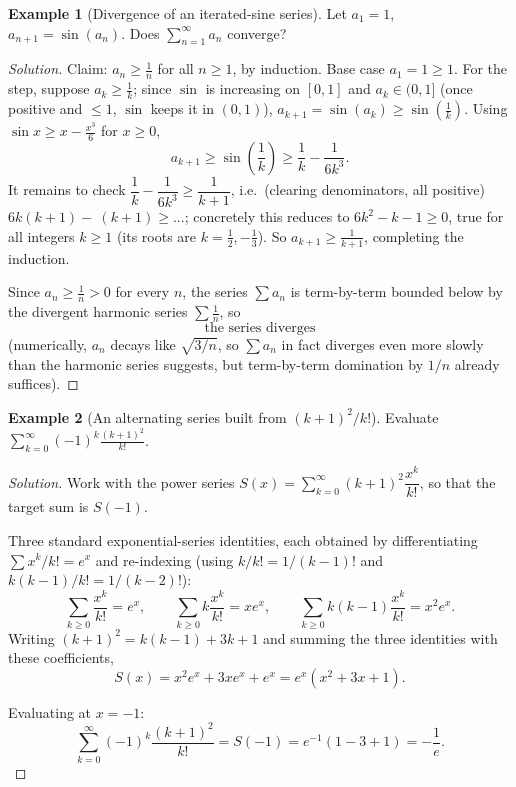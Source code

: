 \documentclass[11pt]{article}
\theoremstyle{definition}
\newtheorem{example}{Example}[section]
\begin{document}
\begin{example}[Divergence of an iterated-sine series]
Let $a_1=1$, $a_{n+1}=\sin(a_n)$. Does $\sum_{n=1}^\infty a_n$ converge?
\end{example}

\begin{proof}[Solution]
Claim: $a_n\ge\tfrac1n$ for all $n\ge1$, by induction. Base case $a_1=1\ge1$. For the step, suppose $a_k\ge\tfrac1k$; since $\sin$ is increasing on $[0,1]$ and $a_k\in(0,1]$ (once positive and $\le1$, $\sin$ keeps it in $(0,1)$), $a_{k+1}=\sin(a_k)\ge\sin\!\left(\tfrac1k\right)$. Using $\sin x\ge x-\tfrac{x^3}6$ for $x\ge0$,
\[
a_{k+1}\ge\sin\!\left(\frac1k\right)\ge\frac1k-\frac1{6k^3}.
\]
It remains to check $\dfrac1k-\dfrac1{6k^3}\ge\dfrac1{k+1}$, i.e.\ (clearing denominators, all positive) $6k(k+1)-\ (k+1)\ge...$; concretely this reduces to $6k^2-k-1\ge0$, true for all integers $k\ge1$ (its roots are $k=\tfrac12,-\tfrac13$). So $a_{k+1}\ge\tfrac1{k+1}$, completing the induction.

Since $a_n\ge\tfrac1n>0$ for every $n$, the series $\sum a_n$ is term-by-term bounded below by the divergent harmonic series $\sum\tfrac1n$, so
\[
\boxed{\text{the series diverges}}
\]
(numerically, $a_n$ decays like $\sqrt{3/n}$, so $\sum a_n$ in fact diverges even more slowly than the harmonic series suggests, but term-by-term domination by $1/n$ already suffices).
\end{proof}

\begin{example}[An alternating series built from $(k+1)^2/k!$]
Evaluate $\displaystyle\sum_{k=0}^\infty(-1)^k\frac{(k+1)^2}{k!}$.
\end{example}

\begin{proof}[Solution]
Work with the power series $S(x)=\sum_{k=0}^\infty(k+1)^2\dfrac{x^k}{k!}$, so that the target sum is $S(-1)$.

Three standard exponential-series identities, each obtained by differentiating $\sum x^k/k!=e^x$ and re-indexing (using $k/k!=1/(k-1)!$ and $k(k-1)/k!=1/(k-2)!$):
\[
\sum_{k\ge0}\frac{x^k}{k!}=e^x,\qquad \sum_{k\ge0}k\frac{x^k}{k!}=xe^x,\qquad \sum_{k\ge0}k(k-1)\frac{x^k}{k!}=x^2e^x.
\]
Writing $(k+1)^2=k(k-1)+3k+1$ and summing the three identities with these coefficients,
\[
S(x)=x^2e^x+3xe^x+e^x=e^x\left(x^2+3x+1\right).
\]

Evaluating at $x=-1$:
\[
\sum_{k=0}^\infty(-1)^k\frac{(k+1)^2}{k!}=S(-1)=e^{-1}(1-3+1)=\boxed{-\frac1e}.
\]
\end{proof}
\end{document}
